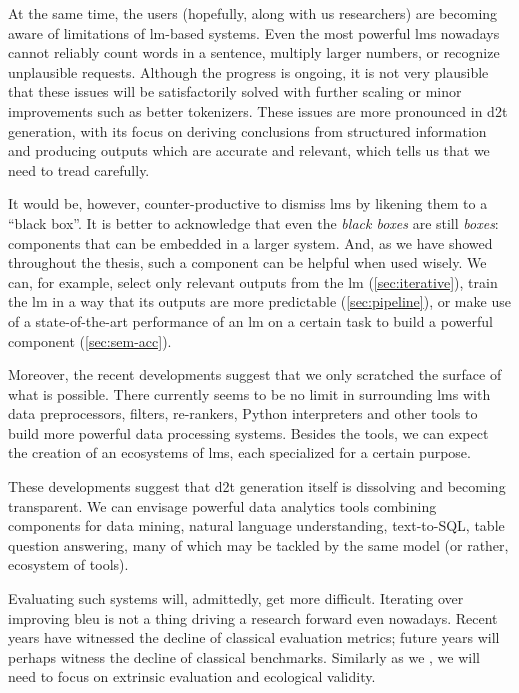 At the same time, the users (hopefully, along with us researchers) are becoming aware of limitations of \ac{lm}-based systems. Even the most powerful \acp{lm} nowadays cannot reliably count words in a sentence, multiply larger numbers, or recognize unplausible requests. Although the progress is ongoing, it is not very plausible that these issues will be satisfactorily solved with further scaling or minor improvements such as better tokenizers. These issues are more pronounced in \ac{d2t} generation, with its focus on deriving conclusions from structured information and producing outputs which are accurate and relevant, which tells us that we need to tread carefully.

It would be, however, counter-productive to dismiss \acp{lm} by likening them to a ``black box''. It is better to acknowledge that even the \emph{black boxes} are still \emph{boxes}: components that can be embedded in a larger system. And, as we have showed throughout the thesis, such a component can be helpful when used wisely. We can, for example, select only relevant outputs from the \ac{lm} (\autoref{sec:iterative}), train the \ac{lm} in a way that its outputs are more predictable (\autoref{sec:pipeline}), or make use of a state-of-the-art performance of an \ac{lm} on a certain task to build a powerful component (\autoref{sec:sem-acc}).

Moreover, the recent developments suggest that we only scratched the surface of what is possible. There currently seems to be no limit in surrounding \acp{lm} with data preprocessors, filters, re-rankers, Python interpreters and other tools to build more powerful data processing systems. Besides the tools, we can expect the creation of an ecosystems of \acp{lm}, each specialized for a certain purpose.

These developments suggest that \ac{d2t} generation itself is dissolving and becoming transparent. We can envisage powerful data analytics tools combining components for data mining, natural language understanding, text-to-SQL, table question answering, many of which may be tackled by the same model (or rather, ecosystem of tools).

Evaluating such systems will, admittedly, get more difficult. Iterating over improving \acs{bleu} is not a thing driving a research forward even nowadays. Recent years have witnessed the decline of classical evaluation metrics; future years will perhaps witness the decline of classical benchmarks. Similarly as we , we will need to focus on extrinsic evaluation and ecological validity.
